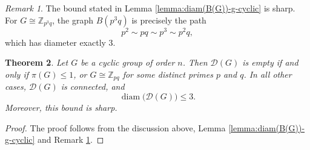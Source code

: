 \documentclass[12pt]{amsart}
\theoremstyle{plain}
\newtheorem{theorem}{Theorem}[section]
\theoremstyle{remark}
\newtheorem{remark}[theorem]{Remark}
\theoremstyle{definition}
\begin{document}
\begin{remark}\label{remrk-tide-bound-B(G)}
The bound stated in Lemma \ref{lemma:diam(B(G))-g-cyclic} is sharp. For $G \cong \mathbb{Z}_{p^3q}$, the graph $B(p^3q)$ is precisely the path
\[
p^2\sim  pq\sim p^3 \sim p^2q,
\]
which has diameter exactly $3.$ 
\end{remark}

\begin{theorem}\label{t:cyclic-diam}
Let $G$ be a cyclic group of order $n$. Then $\mathcal{D}(G)$ is empty if and only if $\pi(G) \leq 1$, or $G \cong \mathbb{Z}_{pq}$ for some distinct primes $p$ and $q$. In all other cases, $\mathcal{D}(G)$ is connected, and
\[
\operatorname{diam}\big(\mathcal{D}(G)\big) \leq 3.
\]
Moreover, this bound is sharp.
\end{theorem}

\begin{proof}

The proof follows from the discussion above, Lemma \ref{lemma:diam(B(G))-g-cyclic} and Remark \ref{remrk-tide-bound-B(G)}.    
\end{proof}
\end{document}
